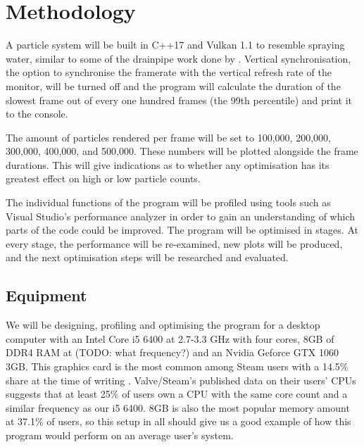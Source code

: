 \documentclass[11pt, a4paper, twocolumn]{article}
\begin{document}
\section{Methodology}

A particle system will be built in C++17 and Vulkan 1.1 to resemble spraying water, similar to some of the drainpipe work done by \citet{Tatarchuk2006}. Vertical synchronisation, the option to synchronise the framerate with the vertical refresh rate of the monitor, will be turned off and the program will calculate the duration of the slowest frame out of every one hundred frames (the 99th percentile) and print it to the console.


The amount of particles rendered per frame will be set to 100,000, 200,000, 300,000, 400,000, and 500,000. These numbers will be plotted alongside the frame durations. This will give indications as to whether any optimisation has its greatest effect on high or low particle counts.

The individual functions of the program will be profiled using tools such as Visual Studio's performance analyzer \citep{VSPerfTools} in order to gain an understanding of which parts of the code could be improved. The program will be optimised in stages. At every stage, the performance will be re-examined, new plots will be produced, and the next optimisation steps will be researched and evaluated.

\subsection{Equipment}

We will be designing, profiling and optimising the program for a desktop computer with an Intel Core i5 6400 at 2.7-3.3 GHz with four cores, 8GB of DDR4 RAM at (TODO: what frequency?) and an Nvidia Geforce GTX 1060 3GB. This  graphics card is the most common among Steam users with a 14.5\% share at the time of writing \citep{SteamSurvey}. Valve/Steam's published data on their users' CPUs suggests that at least 25\% of users own a CPU with the same core count and a similar frequency as our i5 6400. 8GB is also the most popular memory amount at 37.1\% of users, so this setup in all should give us a good example of how this program would perform on an average user's system.


\end{document}
